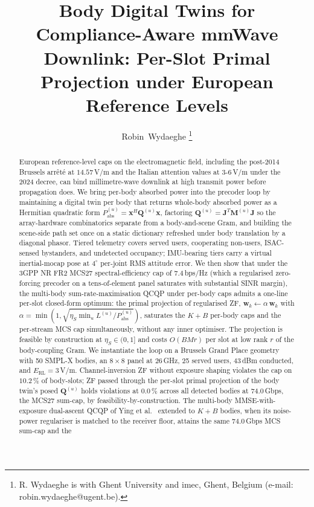 \documentclass[journal,twocolumn,10pt]{IEEEtran}
\title{Body Digital Twins for Compliance-Aware mmWave Downlink:
Per-Slot Primal Projection under European Reference Levels}
\author{Robin~Wydaeghe%
  \thanks{R. Wydaeghe is with Ghent University and imec, Ghent, Belgium
  (e-mail: robin.wydaeghe@ugent.be).}}
\theoremstyle{plain}
\theoremstyle{remark}
\newcommand{\xx}{\mathbf{x}}
\newcommand{\ww}{\mathbf{w}}
\newcommand{\Pabs}{P_{\mathrm{abs}}}
\newcommand{\Qmat}{\mathbf{Q}}
\newcommand{\Mmat}{\mathbf{M}}
\newcommand{\Jmat}{\mathbf{J}}
\begin{document}
\maketitle

\begin{abstract}
European reference-level caps on the electromagnetic field, including
the post-2014 Brussels arrêté at $14.57\,$V/m and the Italian
attention values at $3$-$6\,$V/m under the 2024 decree, can bind
millimetre-wave downlink at high transmit power before propagation
does. We bring per-body absorbed power into the precoder loop by
maintaining a digital twin per body that returns whole-body absorbed
power as a Hermitian quadratic form $\Pabs^{(u)} = \xx^H \Qmat^{(u)}
\xx$, factoring $\Qmat^{(u)} = \Jmat^T \Mmat^{(u)} \Jmat$ so the
array-hardware combinatorics separate from a body-and-scene Gram, and
building the scene-side path set once on a static dictionary
refreshed under body translation by a diagonal phasor. Tiered
telemetry covers served users, cooperating non-users, ISAC-sensed
bystanders, and undetected occupancy; IMU-bearing tiers carry a
virtual inertial-mocap pose at $4^\circ$ per-joint RMS attitude
error. We then show that under the 3GPP NR FR2 MCS27 spectral-efficiency
cap of $7.4\,$bps/Hz (which a regularised zero-forcing precoder on
a tens-of-element panel saturates with substantial SINR margin), the
multi-body sum-rate-maximisation QCQP under per-body caps admits a
one-line per-slot closed-form optimum: the primal projection of
regularised ZF, $\ww_k \leftarrow \alpha\,\ww_k$ with $\alpha =
\min(1, \sqrt{\eta_S \min_u L^{(u)}/\Pabs^{(u)}})$, saturates the
$K + B$ per-body caps and the per-stream MCS cap simultaneously,
without any inner optimiser. The projection is feasible by
construction at $\eta_S \in (0, 1]$ and costs $O(B M r)$ per slot at
low rank $r$ of the body-coupling Gram. We instantiate the loop on
a Brussels Grand Place geometry with 50 SMPL-X bodies, an $8 \times
8$ panel at $26\,$GHz, 25 served users, $43\,$dBm conducted, and
$E_{\mathrm{RL}} = 3\,$V/m. Channel-inversion ZF without exposure
shaping violates the cap on $10.2\,\%$ of body-slots; ZF passed
through the per-slot primal projection of the body twin's posed
$\Qmat^{(u)}$ holds violations at $0.0\,\%$ across all detected
bodies at $74.0\,$Gbps, the MCS27 sum-cap, by
feasibility-by-construction. The multi-body MMSE-with-exposure
dual-ascent QCQP of Ying et al.~\cite{Ying2017} extended to
$K + B$ bodies, when its noise-power regulariser is matched to the
receiver floor, attains the same $74.0\,$Gbps MCS sum-cap and the

\end{abstract}
\end{document}

